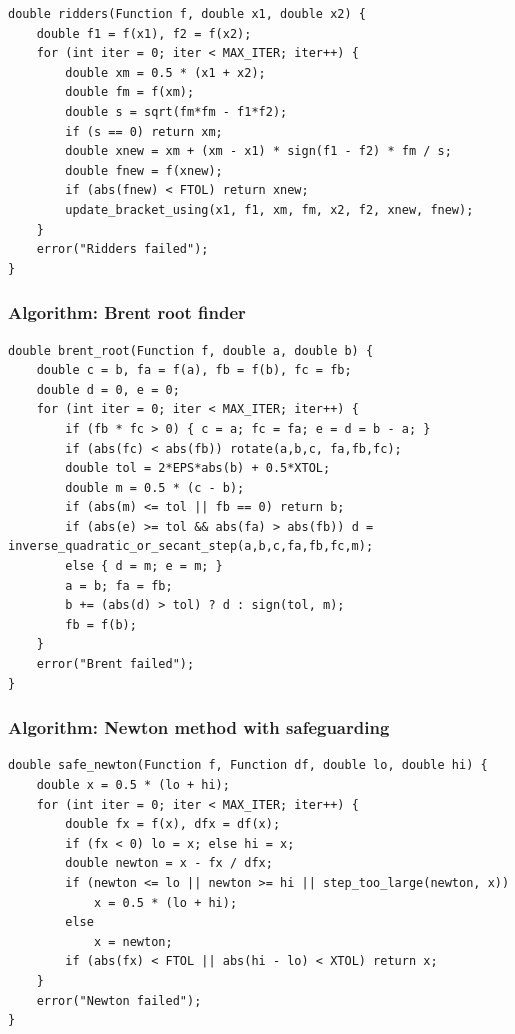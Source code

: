 \documentclass[11pt]{article}
\begin{document}
\begin{verbatim}
double ridders(Function f, double x1, double x2) {
    double f1 = f(x1), f2 = f(x2);
    for (int iter = 0; iter < MAX_ITER; iter++) {
        double xm = 0.5 * (x1 + x2);
        double fm = f(xm);
        double s = sqrt(fm*fm - f1*f2);
        if (s == 0) return xm;
        double xnew = xm + (xm - x1) * sign(f1 - f2) * fm / s;
        double fnew = f(xnew);
        if (abs(fnew) < FTOL) return xnew;
        update_bracket_using(x1, f1, xm, fm, x2, f2, xnew, fnew);
    }
    error("Ridders failed");
}
\end{verbatim}

\subsubsection{Algorithm: Brent root finder}\label{algorithm-brent-root-finder}

\begin{verbatim}
double brent_root(Function f, double a, double b) {
    double c = b, fa = f(a), fb = f(b), fc = fb;
    double d = 0, e = 0;
    for (int iter = 0; iter < MAX_ITER; iter++) {
        if (fb * fc > 0) { c = a; fc = fa; e = d = b - a; }
        if (abs(fc) < abs(fb)) rotate(a,b,c, fa,fb,fc);
        double tol = 2*EPS*abs(b) + 0.5*XTOL;
        double m = 0.5 * (c - b);
        if (abs(m) <= tol || fb == 0) return b;
        if (abs(e) >= tol && abs(fa) > abs(fb)) d = inverse_quadratic_or_secant_step(a,b,c,fa,fb,fc,m);
        else { d = m; e = m; }
        a = b; fa = fb;
        b += (abs(d) > tol) ? d : sign(tol, m);
        fb = f(b);
    }
    error("Brent failed");
}
\end{verbatim}

\subsubsection{Algorithm: Newton method with safeguarding}\label{algorithm-newton-method-with-safeguarding}

\begin{verbatim}
double safe_newton(Function f, Function df, double lo, double hi) {
    double x = 0.5 * (lo + hi);
    for (int iter = 0; iter < MAX_ITER; iter++) {
        double fx = f(x), dfx = df(x);
        if (fx < 0) lo = x; else hi = x;
        double newton = x - fx / dfx;
        if (newton <= lo || newton >= hi || step_too_large(newton, x))
            x = 0.5 * (lo + hi);
        else
            x = newton;
        if (abs(fx) < FTOL || abs(hi - lo) < XTOL) return x;
    }
    error("Newton failed");
}
\end{verbatim}
\end{document}
